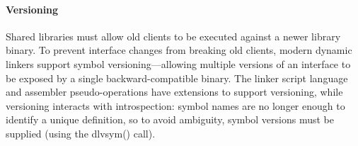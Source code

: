 
\paragraph{Versioning} 
Shared libraries must allow old clients to be executed against a newer library binary.
To prevent interface changes from breaking old clients, 
modern dynamic linkers support symbol versioning---allowing
multiple versions of an interface to be exposed by a single
backward-compatible binary.
The linker script language and assembler pseudo-operations have extensions
to support versioning, while 
versioning interacts with introspection: symbol names
are no longer enough to identify a unique definition,
so to avoid ambiguity, symbol versions must be supplied (using the \textsf{dlvsym()} call).
% 


